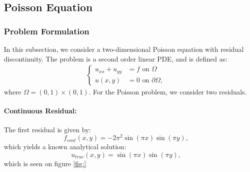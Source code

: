 \begin{figure}
\label{subfig:0.5_predictions}
\label{fig:-1_advection}
\end{figure}



\subsection{Poisson Equation}
\subsubsection{Problem Formulation}
In this subsection, we consider a two-dimensional Poisson equation with residual discontinuity. The problem is a second order linear PDE, and is defined as:
\begin{align}\label{eq:poisson}
\begin{cases}
    u_{xx}+u_{yy} &= f \text{ on } \Omega \\
    u(x,y) &= 0 \text{ on } \partial\Omega,
\end{cases}
\end{align}
where $\Omega = (0,1) \times (0,1)$. For the Poisson problem, we consider two residuals. 
\paragraph{Continuous Residual:}
The first residual is given by:
\begin{equation}
    f_{cont}(x,y)= -2\pi^2\sin(\pi x) \sin(\pi y),
    \label{eq:continuous_poisson}
\end{equation}
which yields a known analytical solution:
\begin{equation*}
    u_{true}(x,y)=\sin(\pi x) \sin(\pi y),
\end{equation*}
which is seen on figure \ref{fig:}

